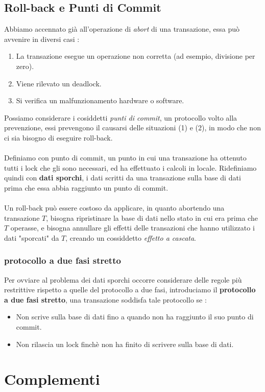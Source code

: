 \documentclass[12pt, letterpaper]{article}
\newcommand{\acc}{\\\hphantom{}\\}
\begin{document}
\subsection{Roll-back e Punti di Commit}
Abbiamo accennato già all'operazione di \textit{abort} di una transazione, essa può avvenire in diversi casi : \begin{enumerate}
    \item La transazione esegue un operazione non corretta (ad esempio, divisione per zero).
    \item Viene rilevato un deadlock. 
    \item Si verifica un malfunzionamento hardware o software.
\end{enumerate}
Possiamo considerare i cosiddetti \textit{punti di commit}, un protocollo volto alla prevenzione, essi prevengono il causarsi 
delle situazioni (1) e (2), in modo che non ci sia bisogno di eseguire roll-back.   \acc Definiamo con punto di commit, un 
punto in cui una transazione ha ottenuto tutti i lock che gli sono necessari, ed ha effettuato i calcoli in locale.
Ridefiniamo quindi con \textbf{dati sporchi}, i dati scritti da una transazione sulla base di dati prima che essa abbia 
raggiunto un punto di commit.\acc 
Un roll-back può essere costoso da applicare, in quanto abortendo una transazione \(T\), bisogna ripristinare la base di dati 
nello stato in cui era prima che \(T\) operasse, e bisogna annullare gli effetti delle transazioni che hanno 
utilizzato i dati "sporcati" da \(T\), creando un cossiddetto \textit{effetto a cascata}.
\subsubsection{protocollo a due fasi stretto}
Per ovviare al problema dei dati sporchi occorre considerare delle regole più restrittive rispetto a quelle 
del protocollo a due fasi, introduciamo il \textbf{protocollo a due fasi stretto}, una transazione soddisfa tale 
protocollo se :\begin{itemize}
    \item Non scrive sulla base di dati fino a quando non ha
    raggiunto il suo punto di commit.
    \item Non rilascia un lock finchè non ha finito di scrivere sulla
    base di dati.
\end{itemize}
\newpage 
\section{Complementi}
\end{document}
